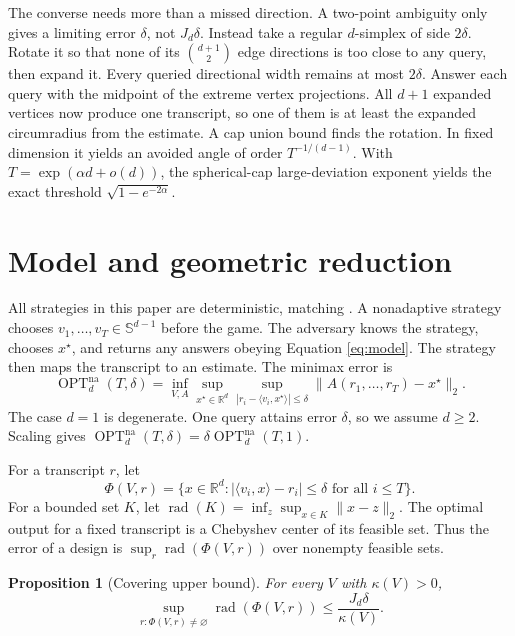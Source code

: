 \documentclass{article}
\newcommand{\R}{\mathbb{R}}
\newcommand{\Sph}{\mathbb{S}}
\newcommand{\ip}[2]{\langle #1,#2\rangle}
\newcommand{\OPT}{\operatorname{OPT}}
\newcommand{\rad}{\operatorname{rad}}
\newcommand{\na}{\mathrm{na}}
\newtheorem{proposition}[theorem]{Proposition}
\theoremstyle{definition}
\begin{document}
The converse needs more than a missed direction.  A two-point ambiguity only gives a limiting error $\delta$, not $J_d\delta$.  Instead take a regular $d$-simplex of side $2\delta$.  Rotate it so that none of its $\binom{d+1}{2}$ edge directions is too close to any query, then expand it. Every queried directional width remains at most $2\delta$.  Answer each query with the midpoint of the extreme vertex projections.  All $d+1$ expanded vertices now produce one transcript, so one of them is at least the expanded circumradius from the estimate.  A cap union bound finds the rotation.  In fixed dimension it yields an avoided angle of order $T^{-1/(d-1)}$.  With $T=\exp(\alpha d+o(d))$, the spherical-cap large-deviation exponent yields the exact threshold $\sqrt{1-e^{-2\alpha}}$.

\section{Model and geometric reduction}                            \label{sec:model}

All strategies in this paper are deterministic, matching \citet{filmus2026optimal}.  A nonadaptive strategy chooses $v_1,\ldots,v_T\in\Sph^{d-1}$ before the game.  The adversary knows the strategy, chooses $x^\star$, and returns any answers obeying Equation \eqref{eq:model}.  The strategy then maps the transcript to an estimate. The minimax error is \[ \OPT^{\na}_d(T,\delta) =\inf_{V,A}\sup_{x^\star\in\R^d} \sup_{|r_i-\ip{v_i}{x^\star}|\leq\delta} \|A(r_1,\ldots,r_T)-x^\star\|_2. \] The case $d=1$ is degenerate.  One query attains error $\delta$, so we assume $d\geq2$.  Scaling gives $\OPT^{\na}_d(T,\delta)=\delta\OPT^{\na}_d(T,1)$.

For a transcript $r$, let
\begin{equation}
 \Phi(V,r)=\{x\in\R^d:|\ip{v_i}{x}-r_i|\leq\delta
                    \text{ for all }i\leq T\}.                    \label{eq:feasible}
\end{equation}
For a bounded set $K$, let $\rad(K)=\inf_z\sup_{x\in K}\|x-z\|_2$. The optimal output for a fixed transcript is a Chebyshev center of its feasible set.  Thus the error of a design is $\sup_r\rad(\Phi(V,r))$ over nonempty feasible sets.

\begin{proposition}[Covering upper bound]                           \label{prop:upper}
For every $V$ with $\kappa(V)>0$, \[ \sup_{r:\Phi(V,r)\neq\varnothing}\rad(\Phi(V,r)) \leq \frac{J_d\delta}{\kappa(V)}. \]
\end{proposition}
\end{document}
